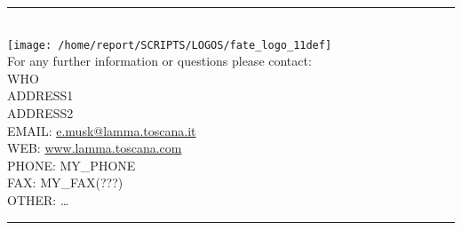 \documentclass[11pt,english]{article}
\newcommand{\HRule}{\rule{\linewidth}{0.5mm}}
\begin{document}
\clearpage

\vspace{1.5cm}
\begin{flushleft}
\HRule \\[0.4cm]
{\texttt{[image: /home/report/SCRIPTS/LOGOS/fate\_logo\_11def]}}
\\
\Large{For any further information or questions please contact:
\\ WHO
\\ ADDRESS1
\\ ADDRESS2
\\ EMAIL: \href{mailto:e.musk@lamma.toscana.it}{e.musk@lamma.toscana.it}
\\ WEB: \href{www.lamma.toscana.com}{www.lamma.toscana.com}
\\ PHONE: MY\_PHONE
\\ FAX: MY\_FAX(???)
\\ OTHER: \dots}
\HRule \\[0.4cm]
\end{flushleft}

\end{document}
